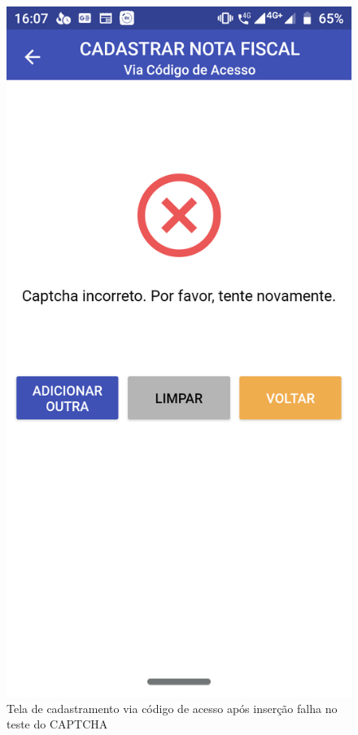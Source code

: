 \newpage
\begin{figure}[h]
    \centering
    \includegraphics[scale=0.15]{tcc/figures/app/app_codigo_acesso_erro_captcha.png}
    \caption{Tela de cadastramento via código de acesso após inserção falha no teste do CAPTCHA}
    \label{appCodigoAcessoErroCaptchaFig}
\end{figure}

